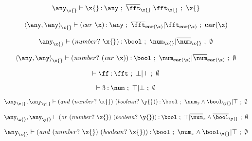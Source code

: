 \documentclass{article}[12pt]
\begin{document}
\newcommand{\xenv}[1]{{#1}_{\x{}}}
\newcommand{\xenvtop}{\xenv{\topty}}
\newcommand{\xyenv}{\xenvtop,\topty_{\y{}}}


\newcommand{\numpx}{\nump{\x{}}}
\newcommand{\boolpx}{\comb{\boolp}{\x{}}}
\newcommand{\boolpy}{\comb{\boolp}{\y{}}}

\newcommand{\cand}[2]{\comb{\andsym}{{#1}\ {#2}}}
\newcommand{\cor}[2]{\comb{\orsym}{{#1}\ {#2}}}

\newcommand{\numbool}{{(\usym\ \num\ \bool)}}
\newcommand{\inumbool}{{(\isym\ \num\ \bool)}}


\begin{displaymath}
  \hastyvar[\xenvtop]{\x{}}{\topty}{\x{}}
\end{displaymath}

\begin{displaymath}
  \hastyvar[{\xenv{\consty{\topty}{\topty}}{}}]{\carx{}}{\topty}{\pecarx{}}
\end{displaymath}

\begin{displaymath}
  \hastypred [\xenvtop] {\numpx} {\num} {\x{}}
\end{displaymath}

\begin{displaymath}
  \hastypred [\xenv{\consty{\topty}{\topty}}] {\nump{\carx}} {\num} {\pecarx}
\end{displaymath}

\begin{displaymath}
  \hastyfalse[\empty]{\ff}{\fft}
\end{displaymath}

\begin{displaymath}
  \hastytrue[\empty]{3}{\num}
\end{displaymath}

\begin{displaymath}
  \hastyeff[\xyenv] {\cand{\numpx}{\boolpy}} {\bool} {\num_{x{}}
    \wedge \bool_{\y{}}}  {\top} {\noobj}
\end{displaymath}

\begin{displaymath}
  \hastyeff[\xyenv] {\cor{\numpx}{\boolpy}} {\bool} {\top}
  {\comp{\num}_{x{}} \wedge \comp{\bool}_{\y{}}}  {\noobj}
\end{displaymath}

\begin{displaymath}
  \hastyeff[\xenvtop] {\cand{\numpx}{\boolpx}} {\bool} {\num_{x{}} \wedge\bool_{\x{}}}  {\top} {\noobj}
\end{displaymath}
\end{document}
